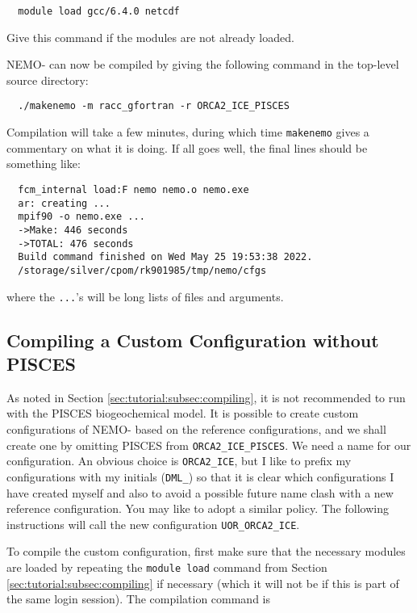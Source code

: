 \begin{verbatim}
  module load gcc/6.4.0 netcdf
\end{verbatim}

\noindent{}Give this command if the modules are not already loaded.

NEMO-\SIcu{} can now be compiled by giving the following command in the top-level source directory:

\begin{verbatim}
  ./makenemo -m racc_gfortran -r ORCA2_ICE_PISCES
\end{verbatim}

\noindent{}Compilation will take a few minutes, during which time \verb|makenemo| gives a commentary on what it is doing.
If all goes well, the final lines should be something like:

\begin{verbatim}
  fcm_internal load:F nemo nemo.o nemo.exe
  ar: creating ...
  mpif90 -o nemo.exe ...
  ->Make: 446 seconds
  ->TOTAL: 476 seconds
  Build command finished on Wed May 25 19:53:38 2022.
  /storage/silver/cpom/rk901985/tmp/nemo/cfgs
\end{verbatim}

\noindent{}where the \verb|...|'s will be long lists of files and arguments.


\subsection{Compiling a Custom Configuration without PISCES}
\label{sec:tutorial:subsec:no-pisces}

As noted in Section \ref{sec:tutorial:subsec:compiling}, it is not recommended to run \SIcu{} with the PISCES biogeochemical model.
It is possible to create custom configurations of NEMO-\SIcu{} based on the reference configurations, and we shall create one by omitting PISCES from \verb|ORCA2_ICE_PISCES|.
We need a name for our configuration.
An obvious choice is \verb|ORCA2_ICE|, but I like to prefix my configurations with my initials (\verb|DML_|) so that it is clear which configurations I have created myself and also to avoid a possible future name clash with a new reference configuration.
You may like to adopt a similar policy.
The following instructions will call the new configuration \verb|UOR_ORCA2_ICE|.

To compile the custom configuration, first make sure that the necessary modules are loaded by repeating the \verb|module load| command from Section \ref{sec:tutorial:subsec:compiling} if necessary (which it will not be if this is part of the same login session).
The compilation command is

